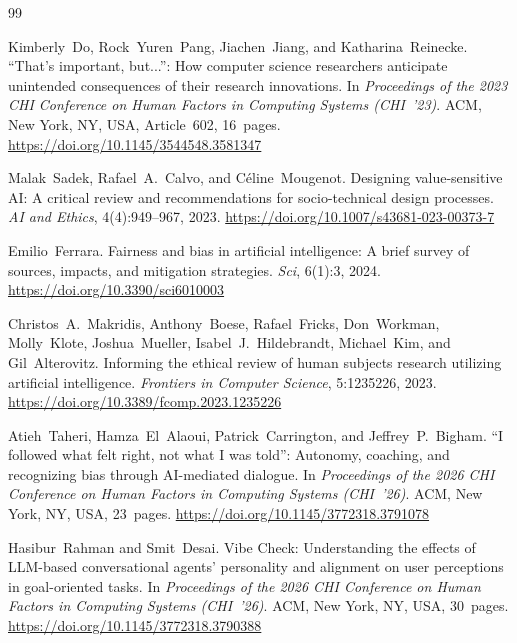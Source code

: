 \documentclass[sigconf,screen]{acmart}
\begin{document}
\begin{thebibliography}{99}

Kimberly~Do, Rock~Yuren~Pang, Jiachen~Jiang, and Katharina~Reinecke.
\newblock ``That's important, but...'': How computer science researchers anticipate
unintended consequences of their research innovations.
\newblock In \emph{Proceedings of the 2023 CHI Conference on Human Factors in
Computing Systems (CHI~'23)}. ACM, New York, NY, USA, Article~602, 16~pages.
\newblock \url{https://doi.org/10.1145/3544548.3581347}

Malak~Sadek, Rafael~A.~Calvo, and C\'{e}line~Mougenot.
\newblock Designing value-sensitive AI: A critical review and recommendations for
socio-technical design processes.
\newblock \emph{AI and Ethics}, 4(4):949--967, 2023.
\newblock \url{https://doi.org/10.1007/s43681-023-00373-7}

Emilio~Ferrara.
\newblock Fairness and bias in artificial intelligence: A brief survey of sources,
impacts, and mitigation strategies.
\newblock \emph{Sci}, 6(1):3, 2024.
\newblock \url{https://doi.org/10.3390/sci6010003}

Christos~A.~Makridis, Anthony~Boese, Rafael~Fricks, Don~Workman, Molly~Klote,
Joshua~Mueller, Isabel~J.~Hildebrandt, Michael~Kim, and Gil~Alterovitz.
\newblock Informing the ethical review of human subjects research utilizing
artificial intelligence.
\newblock \emph{Frontiers in Computer Science}, 5:1235226, 2023.
\newblock \url{https://doi.org/10.3389/fcomp.2023.1235226}

Atieh~Taheri, Hamza~El~Alaoui, Patrick~Carrington, and Jeffrey~P.~Bigham.
\newblock ``I followed what felt right, not what I was told'': Autonomy, coaching,
and recognizing bias through AI-mediated dialogue.
\newblock In \emph{Proceedings of the 2026 CHI Conference on Human Factors in
Computing Systems (CHI~'26)}. ACM, New York, NY, USA, 23~pages.
\newblock \url{https://doi.org/10.1145/3772318.3791078}

Hasibur~Rahman and Smit~Desai.
\newblock Vibe Check: Understanding the effects of LLM-based conversational agents'
personality and alignment on user perceptions in goal-oriented tasks.
\newblock In \emph{Proceedings of the 2026 CHI Conference on Human Factors in
Computing Systems (CHI~'26)}. ACM, New York, NY, USA, 30~pages.
\newblock \url{https://doi.org/10.1145/3772318.3790388}


\end{thebibliography}
\end{document}
